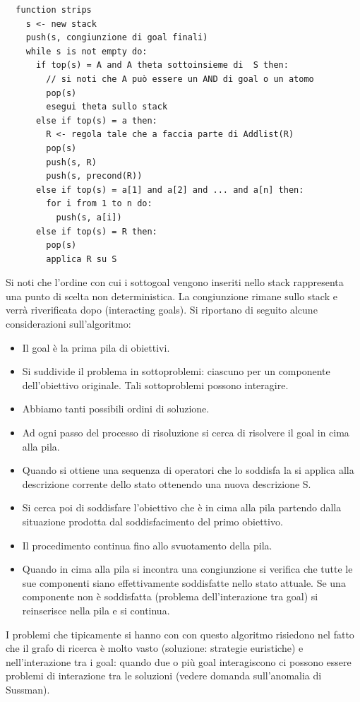 \documentclass[answers, a4paper, 11pt]{exam}
\begin{document}
\begin{questions}
\begin{solution}
  \begin{verbatim}
  function strips
    s <- new stack
    push(s, congiunzione di goal finali)
    while s is not empty do:
      if top(s) = A and A theta sottoinsieme di  S then: 
        // si noti che A può essere un AND di goal o un atomo
        pop(s)
        esegui theta sullo stack
      else if top(s) = a then:
        R <- regola tale che a faccia parte di Addlist(R)
        pop(s)
        push(s, R)
        push(s, precond(R))
      else if top(s) = a[1] and a[2] and ... and a[n] then:
        for i from 1 to n do:
          push(s, a[i])
      else if top(s) = R then:
        pop(s)
        applica R su S
  \end{verbatim}
  
  Si noti che l'ordine con cui i sottogoal vengono inseriti nello stack rappresenta una punto di scelta non deterministica. La congiunzione rimane sullo stack e verrà riverificata dopo (interacting goals).
  Si riportano di seguito alcune considerazioni sull'algoritmo:
  \begin{itemize}
    \item Il goal è la prima pila di obiettivi.
    \item Si suddivide il problema in sottoproblemi: ciascuno per un componente dell'obiettivo originale. Tali sottoproblemi possono interagire.
    \item Abbiamo tanti possibili ordini di soluzione.
    \item Ad ogni passo del processo di risoluzione si cerca di risolvere il goal in cima alla pila.
    \item Quando si ottiene una sequenza di operatori che lo soddisfa la si applica alla descrizione corrente dello stato ottenendo una nuova descrizione S.
    \item Si cerca poi di soddisfare l'obiettivo che è in cima alla pila partendo dalla situazione prodotta dal soddisfacimento del primo obiettivo.
    \item Il procedimento continua fino allo svuotamento della pila.
    \item Quando in cima alla pila si incontra una congiunzione si verifica che tutte le sue componenti siano effettivamente soddisfatte nello stato attuale. Se una componente non è soddisfatta (problema dell’interazione tra goal) si reinserisce nella pila e si continua.
  \end{itemize}
I problemi che tipicamente si hanno con con questo algoritmo risiedono nel fatto che il grafo di ricerca è molto vasto (soluzione: strategie euristiche) e nell'interazione tra i goal: quando due o più goal interagiscono ci possono essere problemi di interazione tra le soluzioni (vedere domanda sull'anomalia di Sussman).
\end{solution}


\end{questions}
\end{document}
